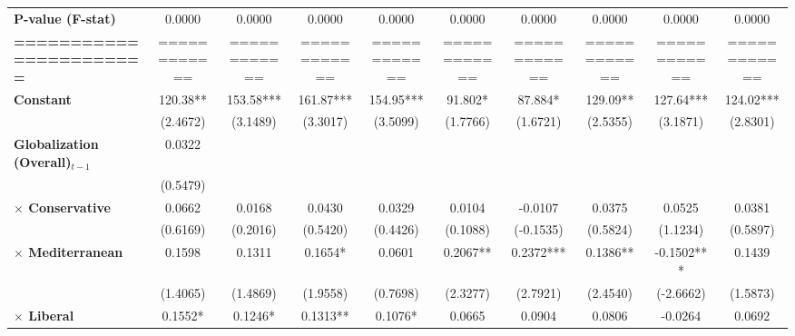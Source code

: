 \begin{center}
\begin{tabular}{lccccccccc}
\textbf{P-value (F-stat)}          &     0.0000     &      0.0000      &      0.0000      &      0.0000      &      0.0000      &      0.0000      &      0.0000      &      0.0000      &      0.0000       \\
\textbf{=======================}   &  ============  &   ============   &   ============   &   ============   &   ============   &   ============   &   ============   &   ============   &   ============    \\
\textbf{Constant}                     &    120.38**    &    153.58***     &    161.87***     &    154.95***     &     91.802*      &     87.884*      &     129.09**     &    127.64***     &    124.02***      \\
\textbf{ }                         &    (2.4672)    &     (3.1489)     &     (3.3017)     &     (3.5099)     &     (1.7766)     &     (1.6721)     &     (2.5355)     &     (3.1871)     &     (2.8301)      \\
\textbf{Globalization (Overall)$_{t-1}$}               &     0.0322     &                  &                  &                  &                  &                  &                  &                  &                   \\
\textbf{ }                         &    (0.5479)    &                  &                  &                  &                  &                  &                  &                  &                   \\
\textbf{$\times$ Conservative}         &     0.0662     &      0.0168      &      0.0430      &      0.0329      &      0.0104      &     -0.0107      &      0.0375      &      0.0525      &      0.0381       \\
\textbf{ }                         &    (0.6169)    &     (0.2016)     &     (0.5420)     &     (0.4426)     &     (0.1088)     &    (-0.1535)     &     (0.5824)     &     (1.1234)     &     (0.5897)      \\
\textbf{$\times$ Mediterranean}        &     0.1598     &      0.1311      &     0.1654*      &      0.0601      &     0.2067**     &    0.2372***     &     0.1386**     &    -0.1502***    &      0.1439       \\
\textbf{ }                         &    (1.4065)    &     (1.4869)     &     (1.9558)     &     (0.7698)     &     (2.3277)     &     (2.7921)     &     (2.4540)     &    (-2.6662)     &     (1.5873)      \\
\textbf{$\times$ Liberal}              &    0.1552*     &     0.1246*      &     0.1313**     &     0.1076*      &      0.0665      &      0.0904      &      0.0806      &     -0.0264      &      0.0692       \\

\end{tabular}
\end{center}
